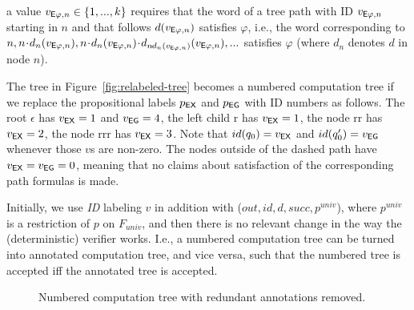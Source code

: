 \- a value $v_{{\operatorname{\mathsf{E}}}\varphi,n} \in \{1,...,k\}$
   requires that the word of a tree path with ID $v_{{\operatorname{\mathsf{E}}}\varphi,n}$
   starting in $n$ and that follows $d(v_{{\operatorname{\mathsf{E}}}\varphi,n})$ satisfies $\varphi$,
   i.e.,
   the word corresponding to
   $n,
   n\!\cdot\! d_n(v_{\E\varphi,n}),
   n\!\cdot\! d_n(v_{\E\varphi,n}) \!\cdot\! d_{n\!\cdot\! d_n(v_{\E\varphi,n})}(v_{\E\varphi,n}),...$
   satisfies $\varphi$
   (where $d_n$ denotes $d$ in node $n$).
\il

\begin{example}
The tree in Figure~\ref{fig:relabeled-tree} becomes a numbered computation tree
if we replace the propositional labels $p_{\operatorname{\mathsf{EX}}}$ and $p_{\operatorname{\mathsf{EG}}}$ with ID numbers as follows.
The root $\epsilon$ has $v_{\operatorname{\mathsf{EX}}} = 1$ and $v_{\operatorname{\mathsf{EG}}} = 4$,
the left child $\mathrm r$ has $v_{\operatorname{\mathsf{EX}}} = 1$,
the node $\mathrm{rr}$ has $v_{\operatorname{\mathsf{EX}}} = 2$,
the node $\mathrm{rrr}$ has $v_{\operatorname{\mathsf{EX}}} = 3$.
Note that $id(q_0) = v_{\operatorname{\mathsf{EX}}}$ and $id(q_0') = v_{\operatorname{\mathsf{EG}}}$ whenever those $v$s are non-zero.
The nodes outside of the dashed path have $v_{\operatorname{\mathsf{EX}}} = v_{\operatorname{\mathsf{EG}}} = 0$,
meaning that no claims about satisfaction of the corresponding path formulas is made.
\end{example}

Initially, we use \emph{ID} labeling $v$ in addition with ($out, id, d, succ, p^\textit{univ}$),
where $p^\textit{univ}$ is a restriction of $p$ on $F_\textit{univ}$,
and then there is no relevant change in the way the (deterministic) verifier works.
I.e., a numbered computation tree can be turned into annotated computation tree, and vice versa,
such that the numbered tree is accepted iff the annotated tree is accepted.

\begin{figure}[tb]
\center

\caption{%
  Numbered computation tree with redundant annotations removed.}
\label{fig:lean-numbered-tree}
\end{figure}

